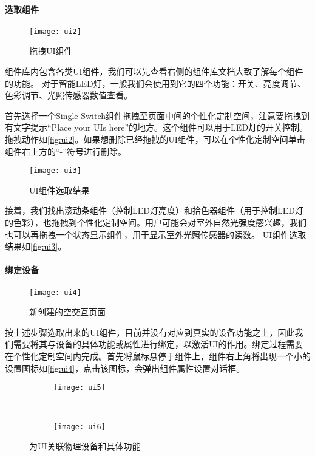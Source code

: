 \paragraph{选取组件}

\begin{figure}[htbp]
	\centering
	\texttt{[image: ui2]}
	\caption{拖拽UI组件}
	\label{fig:ui2}
\end{figure}

组件库内包含各类UI组件，我们可以先查看右侧的组件库文档大致了解每个组件的功能。
对于智能LED灯，一般我们会使用到它的四个功能：开关、亮度调节、色彩调节、光照传感器数值查看。

首先选择一个Single Switch组件拖拽至页面中间的个性化定制空间，注意要拖拽到有文字提示“Place your UIs here”的地方。这个组件可以用于LED灯的开关控制。拖拽动作如\autoref{fig:ui2}。如果想删除已经拖拽的UI组件，可以在个性化定制空间单击组件右上方的“-”符号进行删除。

\begin{figure}[t]
	\centering
	\texttt{[image: ui3]}
	\caption{UI组件选取结果}
	\label{fig:ui3}
\end{figure}

接着，我们找出滚动条组件（控制LED灯亮度）和拾色器组件（用于控制LED灯的色彩），也拖拽到个性化定制空间。用户可能会对室外自然光强度感兴趣，我们也可以再拖拽一个状态显示组件，用于显示室外光照传感器的读数。
UI组件选取结果如\autoref{fig:ui3}。

\paragraph{绑定设备}

\begin{figure}[htbp]
	\centering
	\texttt{[image: ui4]}
	\caption{新创建的空交互页面}
	\label{fig:ui4}
\end{figure}

按上述步骤选取出来的UI组件，目前并没有对应到真实的设备功能之上，因此我们需要将其与设备的具体功能或属性进行绑定，以激活UI的作用。绑定过程需要在个性化定制空间内完成。首先将鼠标悬停于组件上，组件右上角将出现一个小的设置图标如\autoref{fig:ui4}，点击该图标，会弹出组件属性设置对话框。

\begin{figure}[htbp]
	\centering
	\begin{subfigure}{.48\linewidth}
		\texttt{[image: ui5]}
		\caption{}
	\end{subfigure}
	\ 
	\begin{subfigure}{.44\linewidth}
		\texttt{[image: ui6]}
		\caption{}
	\end{subfigure}
	\caption{为UI关联物理设备和具体功能}\label{fig:ui56}
\end{figure}

